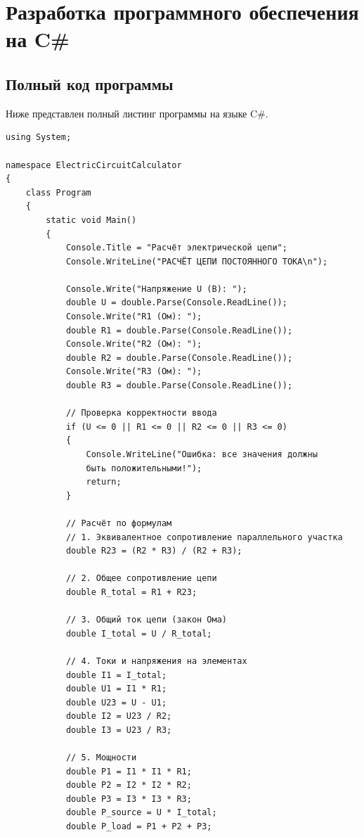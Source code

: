 \section{Разработка программного обеспечения на C\#}

\subsection{Полный код программы}

Ниже представлен полный листинг программы на языке C\#.

\begin{verbatim}
using System;

namespace ElectricCircuitCalculator
{
    class Program
    {
        static void Main()
        {
            Console.Title = "Расчёт электрической цепи";
            Console.WriteLine("РАСЧЁТ ЦЕПИ ПОСТОЯННОГО ТОКА\n");

            Console.Write("Напряжение U (В): ");
            double U = double.Parse(Console.ReadLine());
            Console.Write("R1 (Ом): ");
            double R1 = double.Parse(Console.ReadLine());
            Console.Write("R2 (Ом): ");
            double R2 = double.Parse(Console.ReadLine());
            Console.Write("R3 (Ом): ");
            double R3 = double.Parse(Console.ReadLine());

            // Проверка корректности ввода
            if (U <= 0 || R1 <= 0 || R2 <= 0 || R3 <= 0)
            {
                Console.WriteLine("Ошибка: все значения должны 
                быть положительными!");
                return;
            }

            // Расчёт по формулам
            // 1. Эквивалентное сопротивление параллельного участка
            double R23 = (R2 * R3) / (R2 + R3);
            
            // 2. Общее сопротивление цепи
            double R_total = R1 + R23;
            
            // 3. Общий ток цепи (закон Ома)
            double I_total = U / R_total;
            
            // 4. Токи и напряжения на элементах
            double I1 = I_total;
            double U1 = I1 * R1;
            double U23 = U - U1;
            double I2 = U23 / R2;
            double I3 = U23 / R3;
            
            // 5. Мощности
            double P1 = I1 * I1 * R1;
            double P2 = I2 * I2 * R2;
            double P3 = I3 * I3 * R3;
            double P_source = U * I_total;
            double P_load = P1 + P2 + P3;
            

\end{verbatim}
